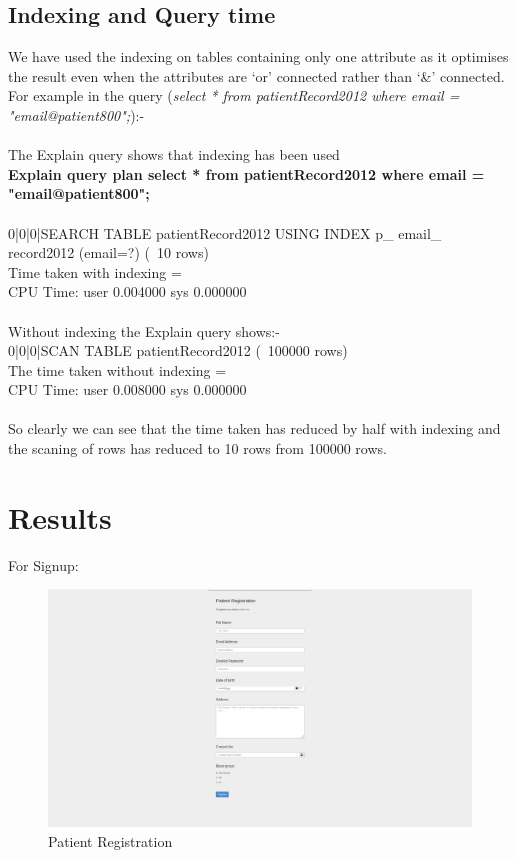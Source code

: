 \documentclass{article}
\begin{document}
\subsection{Indexing and Query time}
We have used the indexing on tables containing only one attribute as it optimises the result even when the attributes are `or' connected rather than `\&' connected. For example in the query ({\it select * from patientRecord2012 where email = "email@patient800";}):-\\\\
The Explain query shows that indexing has been used\\
{\bf Explain query plan select * from patientRecord2012 where email = "email@patient800";}\\\\
0|0|0|SEARCH TABLE patientRecord2012 USING INDEX p\_ email\_ record2012 (email=?) (~10 rows)\\
Time taken with indexing = \\
CPU Time: user 0.004000 sys 0.000000\\\\
Without indexing the Explain query shows:-\\
0|0|0|SCAN TABLE patientRecord2012 (~100000 rows)\\
The time taken without indexing = \\
CPU Time: user 0.008000 sys 0.000000\\\\
So clearly we can see that the time taken has reduced by half with indexing and the scaning of rows has reduced to 10 rows from 100000 rows.\\

 

\section{Results}
For Signup:\\

\begin{figure}[!htbp]
	\centering
	\includegraphics[width=0.95\columnwidth]{patient_reg.png}
	\caption{Patient Registration}
	\label{PR}
\end{figure}
\end{document}
